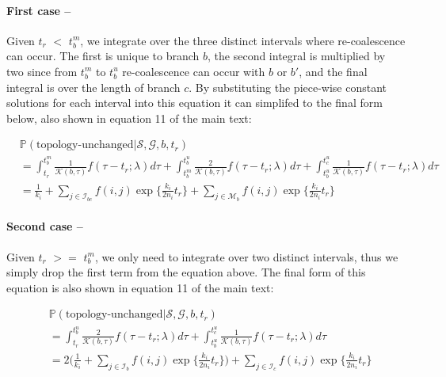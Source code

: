 \documentclass[11pt]{article}
\begin{document}
\paragraph{First case --} Given $t_r$ $<$ $t_b^m$, we integrate over the three
distinct intervals where re-coalescence can occur. The first is unique to branch $b$, 
the second integral is multiplied by two since from $t_b^m$ to $t_b^u$ re-coalescence
can occur with $b$ or $b'$, and the final integral is over the length of branch $c$.
By substituting the piece-wise constant solutions for each interval into this equation
it can simplifed to the final form below, also shown in equation 11 of the main text:

\begin{equation}
\begin{aligned}
	&\mathbb{P}(\text{topology-unchanged} | \mathcal{S}, \mathcal{G}, b, t_r) \\
	&= \int_{t_r}^{t_b^m}
	\frac{1}{\mathcal{K}(b,\tau)} f(\tau - t_r; \lambda) d\tau + 
	\int_{t_b^m}^{t_b^u}
	\frac{2}{\mathcal{K}(b,\tau)} f(\tau - t_r; \lambda) d\tau + 
	\int_{t_b^u}^{t_c^u} \frac{1}{\mathcal{K}(b,\tau)} f(\tau - t_r; \lambda) d\tau \\
	&= \frac{1}{k_i} + 
	\sum_{j \in \mathcal{I}_{bc}}	f(i,j) \exp \bigg\{	\frac{k_i}{2n_i} t_r \bigg\} + 
	\sum_{j \in \mathcal{M}_b}    f(i,j) \exp \bigg\{ \frac{k_i}{2n_i} t_r \bigg\}
\end{aligned}
\end{equation}

\paragraph{Second case --} Given $t_r$ $>=$ $t_b^m$, we only need to integrate over
two distinct intervals, thus we simply drop the first term from the equation above.
The final form of this equation is also shown in equation 11 of the main text:

\begin{equation}
\begin{aligned}
	&\mathbb{P}(\text{topology-unchanged} | \mathcal{S}, \mathcal{G}, b, t_r) \\
	&= \int_{t_r}^{t_b^u} \frac{2}{\mathcal{K}(b,\tau)} f(\tau - t_r; \lambda) d\tau + 
	 \int_{t_b^u}^{t_c^u} \frac{1}{\mathcal{K}(b, \tau)} f(\tau - t_r; \lambda) d\tau \\
	&= 2 \bigg(
		\frac{1}{k_i} + 
		\sum_{j \in \mathcal{I}_b} f(i,j) \exp \bigg\{ \frac{k_i}{2n_i} t_r \bigg\}
	\bigg) + 
	\sum_{j \in \mathcal{I}_c} f(i,j) \exp \bigg\{ \frac{k_i}{2n_i} t_r \bigg\}
\end{aligned}
\end{equation}
\end{document}
